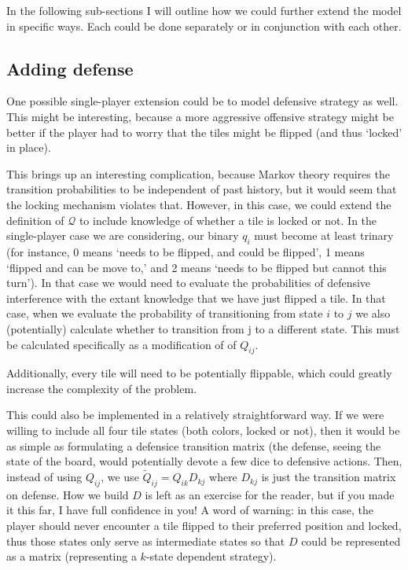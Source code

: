 \documentclass[letterpaper,11pt]{article}
\begin{document}
In the following sub-sections I will outline how we could further extend the
model in specific ways.  Each could be done separately or in conjunction with
each other. 

\subsection{Adding defense}
One possible single-player extension could be to model defensive strategy as
well.  This might be interesting, because a more aggressive offensive strategy
might be better if the player had to worry that the tiles might be flipped (and
thus `locked' in place).

This brings up an interesting complication, because Markov theory requires the
transition probabilities to be independent of past history, but it would seem
that the locking mechanism violates that.  However, in this case, we could
extend the definition of $\mathcal{Q}$ to include knowledge of whether a tile
is locked or not.  In the single-player case we are considering, our binary 
$q_i$ must become at least trinary (for instance, 0 means `needs to be flipped,
and could be flipped', 1 means `flipped and can be move to,'
and 2 means `needs to be flipped but cannot this turn').  In that case we
would need to evaluate the probabilities of defensive interference with the
extant knowledge that we have just flipped a tile.  In that case, when we
evaluate the probability of transitioning from state $i$ to $j$ we also 
(potentially) calculate whether to transition from j to a different state.
This must be calculated specifically as a modification of of $Q_{ij}$.

Additionally, every tile will need to be potentially flippable, which could
greatly increase the complexity of the problem.

This could also be implemented in a relatively straightforward way.  If we were
willing to include all four tile states (both colors, locked or not), then it
would be as simple as formulating a defensice transition matrix (the defense,
seeing the state of the board, would potentially devote a few dice to defensive
actions.  Then, instead of using 
$Q_{ij}$, we use $\tilde{Q}_{ij} = Q_{ik}D_{kj}$ where $D_{kj}$ is just the
transition matrix on defense.  How we build $D$ is left as an exercise for the
reader, but if you made it this far, I have full confidence in you!  A word of
warning: in this case, the player should never encounter a tile flipped to
their preferred position and locked, thus those states only serve as
intermediate states so that $D$ could be represented as a matrix (representing
a $k$-state dependent strategy).
\end{document}
